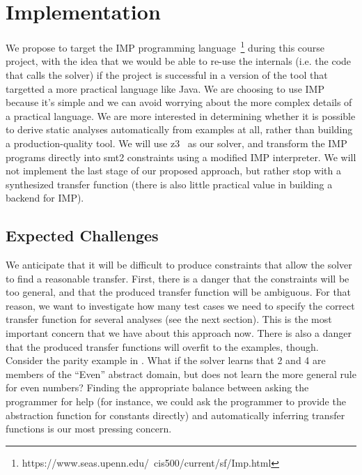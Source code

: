 \documentclass[10pt,conference]{IEEEtran}
\begin{document}
\section{Implementation}

We propose to target the IMP programming language~\footnote{https://www.seas.upenn.edu/~cis500/current/sf/Imp.html}
during this course project, with the idea that we would be able to re-use the internals
(i.e. the code that calls the solver) if the project is successful in
a version of the tool that targetted a more practical language like Java.
We are choosing to use IMP because it's simple and we can avoid worrying
about the more complex details of a practical language. We are more interested
in determining whether it is possible to derive static analyses automatically
from examples at all, rather than building a production-quality tool.
We will use z3~\cite{z3} as our solver, and transform the IMP programs directly
into smt2 constraints using a modified IMP interpreter.
We will not
implement the last stage of our proposed approach, but rather stop with a
synthesized transfer function (there is also little practical value in building
a backend for IMP).

\subsection{Expected Challenges}

We anticipate that it will be difficult to produce constraints that allow
the solver to find a reasonable transfer. First, there is a danger that
the constraints will be too general, and that the produced transfer
function will be ambiguous. For that reason, we want to investigate
how many test cases we need to specify the correct transfer function
for several analyses (see the next section). This is the most important
concern that we have about this approach now. There is also a danger
that the produced transfer functions will overfit to the examples,
though. Consider the parity example in . What if the solver
learns that 2 and 4 are members of the ``Even'' abstract domain, but
does not learn the more general rule for even numbers? Finding the
appropriate balance between asking the programmer for help (for instance,
we could ask the programmer to provide the abstraction function for
constants directly) and automatically inferring transfer functions
is our most pressing concern.
\end{document}
